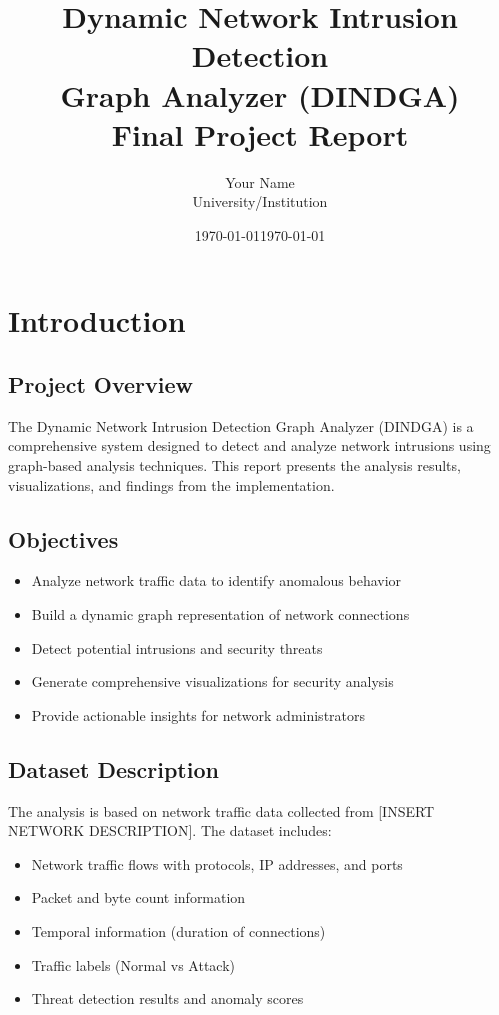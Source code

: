 \documentclass[12pt,a4paper]{report}
\title{
    \textbf{Dynamic Network Intrusion Detection\\
    Graph Analyzer (DINDGA)}\\
    \large{Final Project Report}
}
\author{
    Your Name\\
    University/Institution\\
    \date{\today}
}
\date{\today}
\begin{document}
\maketitle

\tableofcontents
\newpage

\chapter{Introduction}

\section{Project Overview}

The Dynamic Network Intrusion Detection Graph Analyzer (DINDGA) is a comprehensive system designed to detect and analyze network intrusions using graph-based analysis techniques. This report presents the analysis results, visualizations, and findings from the implementation.

\section{Objectives}

\begin{itemize}
    \item Analyze network traffic data to identify anomalous behavior
    \item Build a dynamic graph representation of network connections
    \item Detect potential intrusions and security threats
    \item Generate comprehensive visualizations for security analysis
    \item Provide actionable insights for network administrators
\end{itemize}

\section{Dataset Description}

The analysis is based on network traffic data collected from [INSERT NETWORK DESCRIPTION]. The dataset includes:

\begin{itemize}
    \item Network traffic flows with protocols, IP addresses, and ports
    \item Packet and byte count information
    \item Temporal information (duration of connections)
    \item Traffic labels (Normal vs Attack)
    \item Threat detection results and anomaly scores
\end{itemize}
\end{document}
